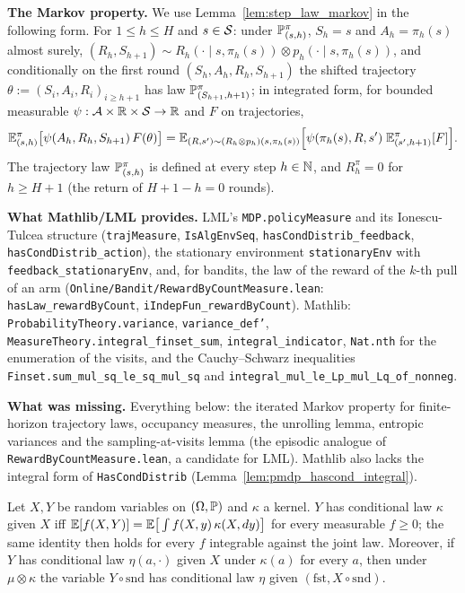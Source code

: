\textbf{The Markov property.} We use Lemma~\ref{lem:step_law_markov} in the following form.
For $1 \le h \le H$ and $s \in \mathcal{S}$: under $\mathbb{P}^\pi_{(s,h)}$, $S_h = s$ and $A_h = \pi_h(s)$
almost surely, $(R_h, S_{h+1}) \sim R_h(\cdot \mid s, \pi_h(s)) \otimes p_h(\cdot \mid s, \pi_h(s))$,
and conditionally on the first round $(S_h, A_h, R_h, S_{h+1})$ the shifted trajectory
$\theta := (S_i, A_i, R_i)_{i \ge h+1}$ has law $\mathbb{P}^\pi_{(S_{h+1}, h+1)}$; in integrated
form, for bounded measurable $\psi : \mathcal{A} \times \mathbb{R} \times \mathcal{S} \to \mathbb{R}$ and $F$ on trajectories,
\begin{equation}\label{eq:pmdp_markov_integrated}
  \mathbb{E}^\pi_{(s,h)}\big[\psi(A_h, R_h, S_{h+1})\, F(\theta)\big]
  = \mathbb{E}_{(R, s') \sim (R_h \otimes p_h)(s, \pi_h(s))}\Big[\psi(\pi_h(s), R, s')\;\mathbb{E}^\pi_{(s',h+1)}[F]\Big] .
\end{equation}
The trajectory law $\mathbb{P}^\pi_{(s, h)}$ is defined at every step $h \in \mathbb{N}$, and $R^\pi_h = 0$
for $h \ge H + 1$ (the return of $H + 1 - h = 0$ rounds).

\textbf{What Mathlib/LML provides.} LML's \texttt{MDP.policyMeasure} and its Ionescu-Tulcea
structure (\texttt{trajMeasure}, \texttt{IsAlgEnvSeq}, \texttt{hasCondDistrib\_feedback},
\texttt{hasCondDistrib\_action}), the stationary environment \texttt{stationaryEnv} with
\texttt{feedback\_stationaryEnv}, and, for bandits, the law of the reward of the $k$-th pull
of an arm (\texttt{Online/Bandit/RewardByCountMeasure.lean}: \texttt{hasLaw\_rewardByCount},
\texttt{iIndepFun\_rewardByCount}). Mathlib: \texttt{ProbabilityTheory.variance},
\texttt{variance\_def'}, \texttt{MeasureTheory.integral\_finset\_sum},
\texttt{integral\_indicator}, \texttt{Nat.nth} for the enumeration of the visits, and the
Cauchy--Schwarz inequalities \texttt{Finset.sum\_mul\_sq\_le\_sq\_mul\_sq} and
\texttt{integral\_mul\_le\_Lp\_mul\_Lq\_of\_nonneg}.

\textbf{What was missing.} Everything below: the iterated Markov property for finite-horizon
trajectory laws, occupancy measures, the unrolling lemma, entropic variances and the
sampling-at-visits lemma (the episodic analogue of \texttt{RewardByCountMeasure.lean}, a
candidate for LML). Mathlib also lacks the integral form of \texttt{HasCondDistrib}
(Lemma~\ref{lem:pmdp_hascond_integral}).

\begin{lemma}\label{lem:pmdp_hascond_integral}
\leanok
Let $X, Y$ be random variables on $(\Omega, \mathbb{P})$ and $\kappa$ a kernel. $Y$ has conditional law
$\kappa$ given $X$ iff $\mathbb{E}[f(X, Y)] = \mathbb{E}\big[\int f(X, y)\,\kappa(X, dy)\big]$ for every measurable
$f \ge 0$; the same identity then holds for every $f$ integrable against the joint law. Moreover,
if $Y$ has conditional law $\eta(a, \cdot)$ given $X$ under $\kappa(a)$ for every $a$, then under
$\mu \otimes \kappa$ the variable $Y \circ \mathrm{snd}$ has conditional law $\eta$ given
$(\mathrm{fst}, X \circ \mathrm{snd})$.
\end{lemma}

